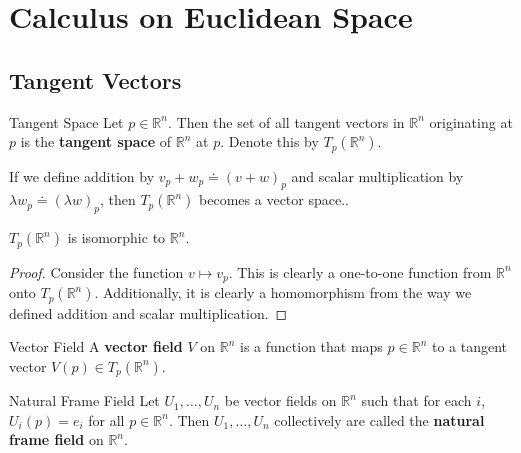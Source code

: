 \documentclass[10pt]{report}
\begin{document}
\tableofcontents


\chapter{Calculus on Euclidean Space}


\section{Tangent Vectors}

\begin{defn}{Tangent Space}{}
	Let $p \in \mathbb{R}^n$. Then the set of all tangent vectors in $\mathbb{R}^n$ originating at $p$ is the \textbf{tangent space} of $\mathbb{R}^n$ at $p$. Denote this by $T_p(\mathbb{R}^n)$.
\end{defn}

If we define addition by $v_p+w_p \doteq (v+w)_p$ and scalar multiplication by $\lambda w_p \doteq (\lambda w)_p$, then $T_p(\mathbb{R}^n)$ becomes a vector space..

\begin{prop}
	$T_p(\mathbb{R}^n)$ is isomorphic to $\mathbb{R}^n$.
\end{prop}
\begin{proof}
	Consider the function $v \mapsto v_p$. This is clearly a one-to-one function from $\mathbb{R}^n$ onto $T_p(\mathbb{R}^n)$. Additionally, it is clearly a homomorphism from the way we defined addition and scalar multiplication.
\end{proof}

\begin{defn}{Vector Field}{}
	A \textbf{vector field} $V$ on $\mathbb{R}^n$ is a function that maps $p \in \mathbb{R}^n$ to a tangent vector $V(p) \in T_p(\mathbb{R}^n)$.
\end{defn}

\begin{defn}{Natural Frame Field}{}
	Let $U_1, \dots, U_n$ be vector fields on $\mathbb{R}^n$ such that for each $i$, $U_i(p) = e_i$ for all $p \in \mathbb{R}^n$. Then $U_1, \dots, U_n$ collectively are called the \textbf{natural frame field} on $\mathbb{R}^n$.
\end{defn}
\end{document}
